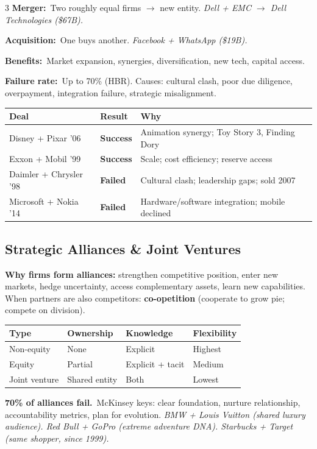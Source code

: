 \documentclass[7.6pt,letterpaper]{article}
\newcommand{\T}[1]{\textbf{\color{navy}#1}}
\newcommand{\kk}[2]{\noindent\T{#1}\ #2\par}
\newcommand{\eg}[1]{\textit{\color{mid}#1}}
\newcommand{\good}[1]{\textcolor{sage}{\textbf{#1}}}
\newcommand{\bad}[1]{\textcolor{rust}{\textbf{#1}}}
\newcommand{\sh}{\rowcolor{strip}}
\newcommand{\ctab}[1]{{\fontsize{6.2pt}{7pt}\selectfont\setlength{\tabcolsep}{2.5pt}#1}}
\begin{document}
\begin{multicols}{3}
\kk{Merger:}{Two roughly equal firms $\to$ new entity. \eg{Dell + EMC $\to$ Dell Technologies (\$67B).}}
\kk{Acquisition:}{One buys another. \eg{Facebook + WhatsApp (\$19B).}}
\kk{Benefits:}{Market expansion, synergies, diversification, new tech, capital access.}
\kk{Failure rate:}{Up to 70\% (HBR). Causes: cultural clash, poor due diligence, overpayment, integration failure, strategic misalignment.}

\ctab{\begin{tabular}{@{}p{2.2cm}p{1.3cm}p{2.1cm}@{}}
\toprule
\sh \T{Deal} & \T{Result} & \T{Why} \\
\midrule
Disney + Pixar '06 & \good{Success} & Animation synergy; Toy Story 3, Finding Dory \\
Exxon + Mobil '99 & \good{Success} & Scale; cost efficiency; reserve access \\
Daimler + Chrysler '98 & \bad{Failed} & Cultural clash; leadership gaps; sold 2007 \\
Microsoft + Nokia '14 & \bad{Failed} & Hardware/software integration; mobile declined \\
\bottomrule
\end{tabular}}

\subsection{Strategic Alliances \& Joint Ventures}

\T{Why firms form alliances:} strengthen competitive position, enter new markets, hedge uncertainty, access complementary assets, learn new capabilities. When partners are also competitors: \T{co-opetition} (cooperate to grow pie; compete on division).

\ctab{\begin{tabular}{@{}p{1.5cm}p{1.4cm}p{1.2cm}p{1.4cm}@{}}
\toprule
\sh \T{Type} & \T{Ownership} & \T{Knowledge} & \T{Flexibility} \\
\midrule
Non-equity & None & Explicit & Highest \\
Equity & Partial & Explicit + tacit & Medium \\
Joint venture & Shared entity & Both & Lowest \\
\bottomrule
\end{tabular}}

\kk{70\% of alliances fail.}{McKinsey keys: clear foundation, nurture relationship, accountability metrics, plan for evolution. \eg{BMW + Louis Vuitton (shared luxury audience). Red Bull + GoPro (extreme adventure DNA). Starbucks + Target (same shopper, since 1999).}}


\end{multicols}
\end{document}
